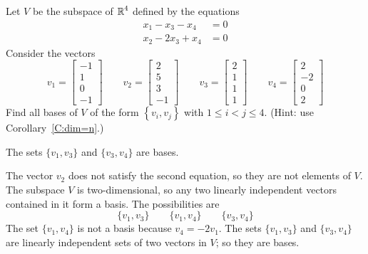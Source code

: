 \documentclass{ximera}
\begin{document}
\begin{exercise} \label{A5.6.1}
Let $V$ be the subspace of $\mbox{$\Bbb{R}$}^4$ defined by the equations
\begin{align*}
x_1-x_3-x_4&=0\\
x_2-2x_3+x_4&=0
\end{align*}
Consider the vectors
\[
v_1=\begin{bmatrix}-1\\1\\0\\-1\end{bmatrix} \qquad 
v_2=\begin{bmatrix}2\\5\\3\\-1\end{bmatrix} \qquad  
v_3=\begin{bmatrix}2\\1\\1\\1\end{bmatrix} \qquad  
v_4=\begin{bmatrix}2\\-2\\0\\2\end{bmatrix}
\]
Find all bases of $V$ of the form $\left\{v_i,v_j\right\}$ with $1\leq i< j\leq 4.$ (Hint: use Corollary~\ref{C:dim=n}.)

\begin{solution}
\ans The sets $\{v_1,v_3\}$ and $\{v_3,v_4\}$ are bases. 

\soln The vector $v_2$ does not satisfy the second equation, so they are not elements of $V$.  
The subspace $V$ is two-dimensional, so any two linearly independent vectors contained in it form a basis. 
The possibilities are 
\[
\{v_1,v_3\} \qquad  \{v_1,v_4\} \qquad \{v_3,v_4\}
\]
The set $\{v_1,v_4\}$ is not a basis because $v_4= -2v_1$. The sets $\{v_1,v_3\}$ and $\{v_3,v_4\}$ are 
linearly independent sets of two vectors in $V$; so they are bases. 
\end{solution}
\end{exercise}
\end{document}
